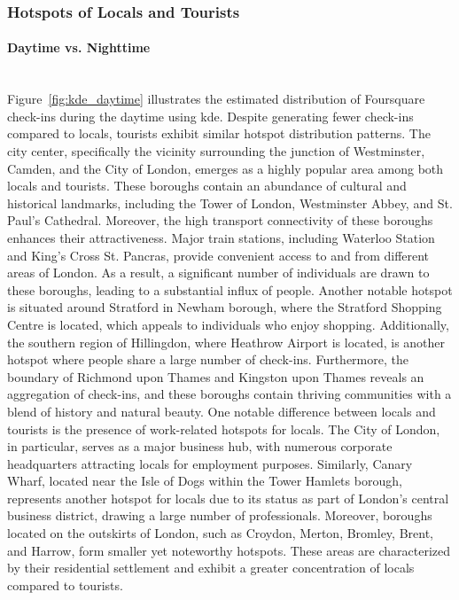 \documentclass{article}
\newcommand{\subsubsubsection}[1]{\paragraph{#1}\mbox{}\\}
\begin{document}
\subsubsection{Hotspots of Locals and Tourists} \label{hotspots}

\subsubsubsection{Daytime vs. Nighttime}
Figure~\ref{fig:kde_daytime} illustrates the estimated distribution of Foursquare check-ins during the daytime using \acrshort{kde}. Despite generating fewer check-ins compared to locals, tourists exhibit similar hotspot distribution patterns. The city center, specifically the vicinity surrounding the junction of Westminster, Camden, and the City of London, emerges as a highly popular area among both locals and tourists. These boroughs contain an abundance of cultural and historical landmarks, including the Tower of London, Westminster Abbey, and St. Paul's Cathedral. Moreover, the high transport connectivity of these boroughs enhances their attractiveness. Major train stations, including Waterloo Station and King's Cross St. Pancras, provide convenient access to and from different areas of London. As a result, a significant number of individuals are drawn to these boroughs, leading to a substantial influx of people. Another notable hotspot is situated around Stratford in Newham borough, where the Stratford Shopping Centre is located, which appeals to individuals who enjoy shopping. Additionally, the southern region of Hillingdon, where Heathrow Airport is located, is another hotspot where people share a large number of check-ins. Furthermore, the boundary of Richmond upon Thames and Kingston upon Thames reveals an aggregation of check-ins, and these boroughs contain thriving communities with a blend of history and natural beauty. One notable difference between locals and tourists is the presence of work-related hotspots for locals. The City of London, in particular, serves as a major business hub, with numerous corporate headquarters attracting locals for employment purposes. Similarly, Canary Wharf, located near the Isle of Dogs within the Tower Hamlets borough, represents another hotspot for locals due to its status as part of London's central business district, drawing a large number of professionals. Moreover, boroughs located on the outskirts of London, such as Croydon, Merton, Bromley, Brent, and Harrow, form smaller yet noteworthy hotspots. These areas are characterized by their residential settlement and exhibit a greater concentration of locals compared to tourists.
\end{document}
